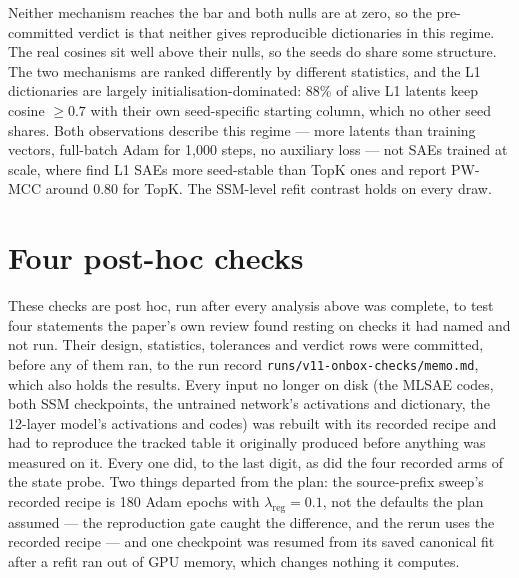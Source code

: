 Neither mechanism reaches the bar and both nulls are at zero, so the
pre-committed verdict is that neither gives reproducible dictionaries in this
regime. The real cosines sit well above their nulls, so the seeds do share
some structure. The two mechanisms are ranked differently by different
statistics, and the L1 dictionaries are largely initialisation-dominated:
88\% of alive L1 latents keep cosine $\ge 0.7$ with their own seed-specific
starting column, which no other seed shares. Both observations describe this
regime --- more latents than training vectors, full-batch Adam for 1{,}000
steps, no auxiliary loss --- not SAEs trained at scale, where
\citet{paulo2026seeds} find L1 SAEs more seed-stable than TopK ones and
\citet{song2026consistency} report PW-MCC around 0.80 for TopK. The SSM-level
refit contrast holds on every draw.

\section{Four post-hoc checks}
\label{app:checks}

These checks are post hoc, run after every analysis above was complete, to
test four statements the paper's own review found resting on checks it had
named and not run. Their design, statistics, tolerances and verdict rows were
committed, before any of them ran, to the run record
\nolinkurl{runs/v11-onbox-checks/memo.md}, which also holds the results. Every
input no longer on disk (the MLSAE codes, both SSM checkpoints, the untrained
network's activations and dictionary, the 12-layer model's activations and
codes) was rebuilt with its recorded recipe and had to reproduce the tracked
table it originally produced before anything was measured on it. Every one
did, to the last digit, as did the four recorded arms of the state probe. Two
things departed from the plan: the source-prefix sweep's recorded recipe is
180 Adam epochs with $\lambda_{\mathrm{reg}} = 0.1$, not the defaults the plan
assumed --- the reproduction gate caught the difference, and the rerun uses
the recorded recipe --- and one checkpoint was resumed from its saved
canonical fit after a refit ran out of GPU memory, which changes nothing it
computes.

